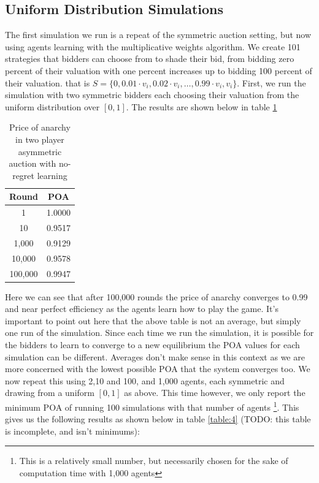 \documentclass[12pt,twoside]{reedthesis}
\begin{document}
\subsection{Uniform Distribution Simulations}
The first simulation we run is a repeat of the symmetric auction setting, but now using agents learning with the multiplicative weights algorithm. We create 101 strategies that bidders can choose from to shade their bid, from bidding zero percent of their valuation with one percent increases up to bidding 100 percent of their valuation. that is $S = \{ 0, 0.01 \cdot v_i, 0.02 \cdot v_i, \ldots, 0.99 \cdot v_i, v_i \}$. First, we run the simulation with two symmetric bidders each choosing their valuation from the uniform distribution over $[0,1]$. The results are shown below in table \ref{table:3}

\begin{table}[h!]
	\begin{center}
		\begin{tabular}{ |c|c| }
			\hline
			Round & POA \\
			\hline
			1 & 1.0000 \\
			10 & 0.9517 \\
			1,000 & 0.9129 \\
			10,000 & 0.9578 \\
			100,000 & 0.9947 \\
			\hline
		\end{tabular}
		\caption{Price of anarchy in two player asymmetric auction with no-regret learning}
		\label{table:3}
	\end{center} 
\end{table}

Here we can see that after 100,000 rounds the price of anarchy converges to 0.99 and near perfect efficiency as the agents learn how to play the game. It's important to point out here that the above table is not an average, but simply one run of the simulation. Since each time we run the simulation, it is possible for the bidders to learn to converge to a new equilibrium the POA values for each simulation can be different. Averages don't make sense in this context as we are more concerned with the lowest possible POA that the system converges too. We now repeat this using 2,10 and 100, and 1,000 agents, each symmetric and drawing from a uniform $[0,1]$ as above. This time however, we only report the minimum POA of running 100 simulations with that number of agents \footnote{This is a relatively small number, but necessarily chosen for the sake of computation time with 1,000 agents}. This gives us the following results as shown  below in table \ref{table:4} (TODO: this table is incomplete, and isn't minimums):
\end{document}
